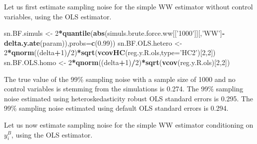 \documentclass[]{book}
\newenvironment{Shaded}{\begin{snugshade}}{\end{snugshade}}
\newcommand{\KeywordTok}[1]{\textcolor[rgb]{0.13,0.29,0.53}{\textbf{#1}}}
\newcommand{\DataTypeTok}[1]{\textcolor[rgb]{0.13,0.29,0.53}{#1}}
\newcommand{\DecValTok}[1]{\textcolor[rgb]{0.00,0.00,0.81}{#1}}
\newcommand{\FloatTok}[1]{\textcolor[rgb]{0.00,0.00,0.81}{#1}}
\newcommand{\StringTok}[1]{\textcolor[rgb]{0.31,0.60,0.02}{#1}}
\newcommand{\OperatorTok}[1]{\textcolor[rgb]{0.81,0.36,0.00}{\textbf{#1}}}
\newcommand{\NormalTok}[1]{#1}
\theoremstyle{definition}
\theoremstyle{definition}
\theoremstyle{definition}
\theoremstyle{remark}
\let\BeginKnitrBlock\begin \let\EndKnitrBlock\end
\begin{document}
\BeginKnitrBlock{example}
\protect\hypertarget{exm:unnamed-chunk-77}{}{\label{exm:unnamed-chunk-77}
}Let us first estimate sampling noise for the simple WW estimator
without control variables, using the OLS estimator.
\EndKnitrBlock{example}

\begin{Shaded}
\begin{Highlighting}[]
\NormalTok{sn.BF.simuls <-}\StringTok{ }\DecValTok{2}\OperatorTok{*}\KeywordTok{quantile}\NormalTok{(}\KeywordTok{abs}\NormalTok{(simuls.brute.force.ww[[}\StringTok{'1000'}\NormalTok{]][,}\StringTok{'WW'}\NormalTok{]}\OperatorTok{-}\KeywordTok{delta.y.ate}\NormalTok{(param)),}\DataTypeTok{probs=}\KeywordTok{c}\NormalTok{(}\FloatTok{0.99}\NormalTok{))}
\NormalTok{sn.BF.OLS.hetero <-}\StringTok{ }\DecValTok{2}\OperatorTok{*}\KeywordTok{qnorm}\NormalTok{((delta}\OperatorTok{+}\DecValTok{1}\NormalTok{)}\OperatorTok{/}\DecValTok{2}\NormalTok{)}\OperatorTok{*}\KeywordTok{sqrt}\NormalTok{(}\KeywordTok{vcovHC}\NormalTok{(reg.y.R.ols,}\DataTypeTok{type=}\StringTok{'HC2'}\NormalTok{)[}\DecValTok{2}\NormalTok{,}\DecValTok{2}\NormalTok{])}
\NormalTok{sn.BF.OLS.homo <-}\StringTok{ }\DecValTok{2}\OperatorTok{*}\KeywordTok{qnorm}\NormalTok{((delta}\OperatorTok{+}\DecValTok{1}\NormalTok{)}\OperatorTok{/}\DecValTok{2}\NormalTok{)}\OperatorTok{*}\KeywordTok{sqrt}\NormalTok{(}\KeywordTok{vcov}\NormalTok{(reg.y.R.ols)[}\DecValTok{2}\NormalTok{,}\DecValTok{2}\NormalTok{])}
\end{Highlighting}
\end{Shaded}

The true value of the 99\% sampling noise with a sample size of 1000 and
no control variables is stemming from the simulations is 0.274. The 99\%
sampling noise estimated using heteroskedasticity robust OLS standard
errors is 0.295. The 99\% sampling noise estimated using default OLS
standard errors is 0.294.

Let us now estimate sampling noise for the simple WW estimator
conditioning on \(y_i^B\), using the OLS estimator.
\end{document}
